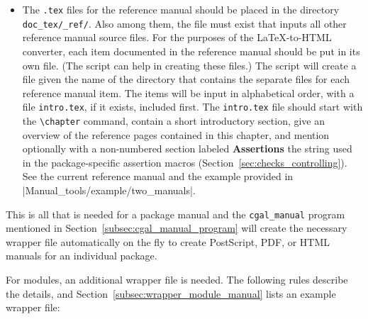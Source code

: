 \begin{itemize}
   \item The {\tt .tex} files for the reference manual should be placed in the 
         directory \verb|doc_tex/|\verb|_ref/|.
         Also among them, the file 
          must exist that inputs all other reference
         manual source files.
         For the purposes of the \LaTeX -to-HTML converter, each item 
         documented in the reference manual should be put in its own file. 
         (The script  can help
          in creating these files.)
         The script  
         will create a 
         file given the name of the directory that contains the separate files 
         for each
         reference manual item.  The items will be input in alphabetical order,
         with a file {\tt intro.tex}, if it 
         exists, included first.  The
         {{\tt intro.tex}} file should start with the \verb|\chapter| command,
         contain a short introductory section, give an overview of the
         reference pages contained in this chapter, and mention
         optionally with a non-numbered section labeled \textbf{Assertions} 
         the string used in the package-specific assertion macros 
         (Section~\ref{sec:checks_controlling}).  See the current reference
         manual and the example provided in
         \nonlinkedpath|Manual_tools/example/two_manuals|. 
\end{itemize}

This is all that is needed for a package manual and the
\texttt{cgal\_manual} program mentioned in
Section~\ref{subsec:cgal_manual_program} will create the necessary
wrapper file automatically on the fly to create PostScript, PDF, or
HTML manuals for an individual package.

For modules, an additional wrapper file is needed. The following rules
describe the details, and Section~\ref{subsec:wrapper_module_manual}
lists an example wrapper file:

